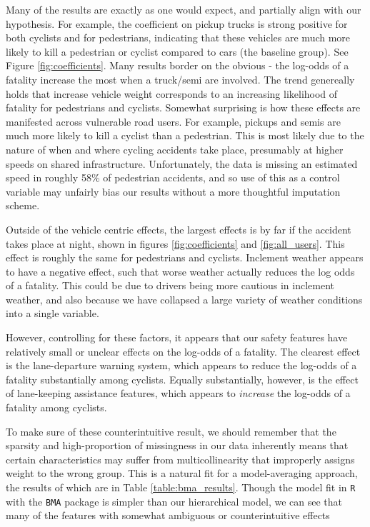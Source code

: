 \documentclass[12pt]{article}
\begin{document}
Many of the results are exactly as one would expect, and partially align with our hypothesis. For example, the
coefficient on pickup trucks is strong positive for both cyclists and for pedestrians, indicating that these vehicles
are much more likely to kill a pedestrian or cyclist compared to cars (the baseline group). See
Figure \ref{fig:coefficients}. Many results border on the obvious - the log-odds of a fatality increase the most when
a truck/semi are involved. The trend genereally holds that increase vehicle weight corresponds to an increasing
likelihood of fatality for pedestrians and cyclists. Somewhat surprising is how these effects are manifested across
vulnerable road users. For example, pickups and semis are much more likely to kill a cyclist than a pedestrian. This is
most likely due to the nature of when and where cycling accidents take place, presumably at higher speeds on shared
infrastructure. Unfortunately, the data is missing an estimated speed in roughly 58\% of pedestrian accidents, and so
use of this as a control variable may unfairly bias our results without a more thoughtful imputation scheme.

Outside of the vehicle centric effects, the largest effects is by far if the accident takes place at night, shown in
figures \ref{fig:coefficients} and \ref{fig:all_users}. This effect is roughly the same for pedestrians and cyclists. 
Inclement weather appears to have a negative effect, such that
worse weather actually reduces the log odds of a fatality. This could be due to drivers being more cautious in
inclement weather, and also because we have collapsed a large variety of weather conditions into a single variable.

However, controlling for these factors, it appears that our safety features have relatively small or unclear effects on
the log-odds of a fatality. The clearest effect is the lane-departure warning system, which appears to reduce the
log-odds of a fatality substantially among cyclists. Equally substantially, however, is the effect of lane-keeping
assistance features, which appears to \textit{increase} the log-odds of a fatality among cyclists.

To make sure of these counterintuitive result, we should remember that the sparsity and high-proportion of missingness
in our data inherently means that certain characteristics may suffer from multicollinearity that improperly
assigns weight to the wrong group. This is a natural fit for a model-averaging approach, the results of which are in 
Table \ref{table:bma_results}. Though the model fit in \texttt{R} with the \texttt{BMA} package is simpler
than our hierarchical model, we can see that many of the features with somewhat ambiguous or counterintuitive 
effects
\end{document}
